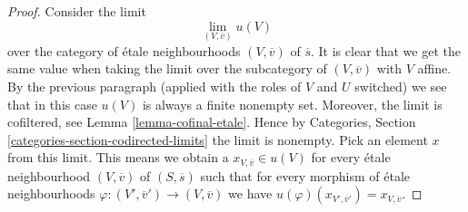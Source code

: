 \begin{proof}
\medskip\noindent
Consider the limit
$$
\lim_{(V, \overline{v})} u(V)
$$
over the category of \'etale neighbourhoods $(V, \overline{v})$ of
$\overline{s}$. It is clear that we get the same value when taking
the limit over the subcategory of $(V, \overline{v})$ with $V$ affine.
By the previous paragraph (applied with the roles of $V$ and $U$ switched)
we see that in this case $u(V)$ is always a finite nonempty set.
Moreover, the limit is cofiltered, see
Lemma \ref{lemma-cofinal-etale}.
Hence by
Categories, Section \ref{categories-section-codirected-limits}
the limit is nonempty. Pick an element $x$ from this limit.
This means we obtain a $x_{V, \overline{v}} \in u(V)$ for
every \'etale neighbourhood $(V, \overline{v})$ of $(S, \overline{s})$
such that for every morphism of \'etale neighbourhoods
$\varphi : (V', \overline{v}') \to (V, \overline{v})$ we have
$u(\varphi)(x_{V', \overline{v}'}) = x_{V, \overline{v}}$.


\end{proof}
